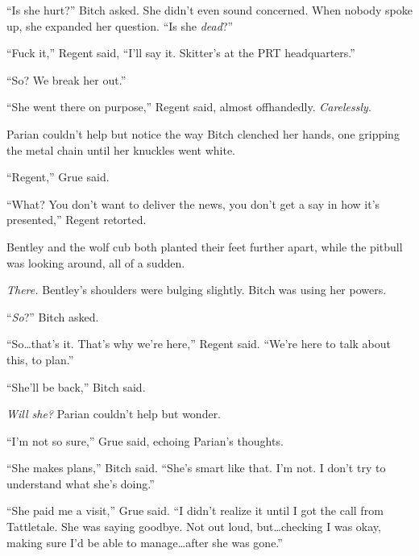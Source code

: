 ``Is she hurt?'' Bitch asked.  She didn't even sound concerned.  When nobody spoke up, she expanded her question.  ``Is she \emph{dead}?''



``Fuck it,'' Regent said, ``I'll say it.  Skitter's at the PRT headquarters.''



``So?  We break her out.''



``She went there on purpose,'' Regent said, almost offhandedly.  \emph{Carelessly}.



Parian couldn't help but notice the way Bitch clenched her hands, one gripping the metal chain until her knuckles went white.



``Regent,'' Grue said.



``What?  You don't want to deliver the news, you don't get a say in how it's presented,'' Regent retorted.



Bentley and the wolf cub both planted their feet further apart, while the pitbull was looking around, all of a sudden.



\emph{There.}  Bentley's shoulders were bulging slightly.  Bitch was using her powers.



``\emph{So}?'' Bitch asked.



``So\ldots that's it.  That's why we're here,'' Regent said.  ``We're here to talk about this, to plan.''



``She'll be back,'' Bitch said.



\emph{Will she?  }Parian couldn't help but wonder.



``I'm not so sure,'' Grue said, echoing Parian's thoughts.



``She makes plans,'' Bitch said.  ``She's smart like that.  I'm not.  I don't try to understand what she's doing.''



``She paid me a visit,'' Grue said.  ``I didn't realize it until I got the call from Tattletale.  She was saying goodbye.  Not out loud, but\ldots checking I was okay, making sure I'd be able to manage\ldots after she was gone.''




